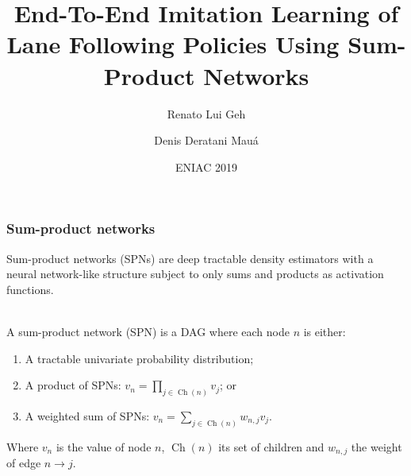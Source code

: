 \documentclass{beamer}
\title[Self-driving with SPNs]{End-To-End Imitation Learning of Lane Following Policies Using
Sum-Product Networks}
\date{ENIAC 2019}
\author[R. Geh, D. Mauá]{Renato Lui Geh \and Denis Deratani Mauá}
\institute[IME-USP]{Institute of Mathematics and Statistics \\\scriptsize University of São Paulo}
\DeclareMathOperator*{\Ch}{\text{Ch}}
\begin{document}
\maketitle

\begin{frame}
  \frametitle{Sum-product networks}

  Sum-product networks (SPNs) are deep tractable density estimators with a neural network-like
  structure subject to only sums and products as activation functions.
  \vspace{0.5cm}

  \begin{definition}~\\
    A sum-product network (SPN) is a DAG where each node $n$ is either:
    \begin{enumerate}
      \item A tractable univariate probability distribution;
      \item A product of SPNs: $v_n=\prod_{j\in\Ch(n)}v_j$; or
      \item A weighted sum of SPNs: $v_n=\sum_{j\in\Ch(n)}w_{n,j}v_j$.
    \end{enumerate}
    Where $v_n$ is the value of node $n$, $\Ch(n)$ its set of children and $w_{n,j}$ the weight of
    edge $n\to j$.
  \end{definition}
\end{frame}
\end{document}
